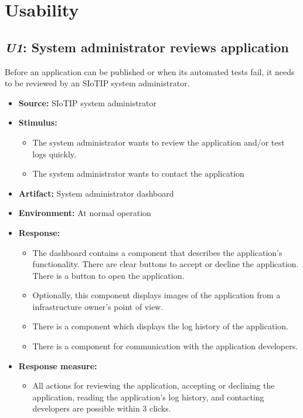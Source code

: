 \documentclass[english]{sareport}
\begin{document}
\section{Usability}
\subsection{\emph{U1}: System administrator reviews application}
Before an application can be published or when its automated tests
fail, it needs to be reviewed by an SIoTIP system administrator.

\begin{itemize}
    \item \textbf{Source:} SIoTIP system administrator
    \item \textbf{Stimulus:}
        \begin{itemize}
            \item The system administrator wants to review the application
                  and/or test logs quickly.
            \item The system administrator wants to contact the application
        \end{itemize}
    \item \textbf{Artifact:} System administrator dashboard
    \item \textbf{Environment:} At normal operation
    \item \textbf{Response:}
        \begin{itemize}
            \item The dashboard contains a component that describes the application's
                  functionality. There are clear buttons to accept or decline
                  the application. There is a button to open the application.
            \item Optionally, this component displays images
                  of the application from a infrastructure owner's point of view.
            \item There is a component which displays the log history of the application.
            \item There is a component for communication with the application developers.
        \end{itemize}

    \item \textbf{Response measure:}
        \begin{itemize}
            \item All actions for reviewing the application, accepting or
                  declining the application, reading the application's log history,
                  and contacting developers are possible within 3 clicks.
        \end{itemize}
\end{itemize}
\end{document}
